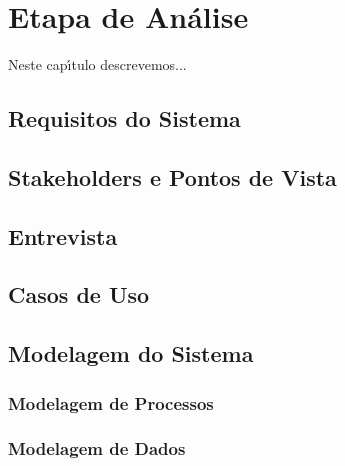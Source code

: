 
\chapter{Etapa de An\'{a}lise}

Neste cap\'{\i}tulo descrevemos...



\section{Requisitos do Sistema}



\section{Stakeholders e Pontos de Vista}


\section{Entrevista}


\section{ Casos de Uso}



\section{Modelagem do Sistema}


    \subsection{Modelagem de Processos}


    \subsection{Modelagem de Dados}

